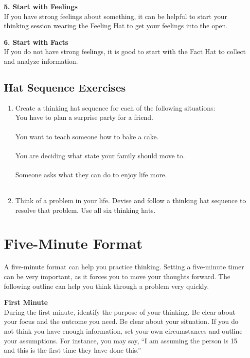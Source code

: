 \textbf{5. Start with Feelings} \\
If you have strong feelings about something, it can be helpful to start your thinking session wearing the Feeling Hat to get your feelings into the open.

\textbf{6. Start with Facts} \\
If you do not have strong feelings, it is good to start with the Fact Hat to collect and analyze information. 

\section*{Hat Sequence Exercises}

\begin{enumerate}
	\item Create a thinking hat sequence for each of the following situations: \\
	You have to plan a surprise party for a friend. \\~\\
	You want to teach someone how to bake a cake. \\~\\
	You are deciding what state your family should move to. \\~\\
	Someone asks what they can do to enjoy life more. \\~\\
	\item Think of a problem in your life. Devise and follow a thinking hat sequence to resolve that problem. Use all six thinking hats.
\end{enumerate}

\chapter{Five-Minute Format}


A five-minute format can help you practice thinking. Setting a five-minute timer can be very important, as it forces you to move your thoughts forward. The following outline can help you think through a problem very quickly.

\textbf{First Minute} \\
During the first minute, identify the purpose of your thinking. Be clear about your focus and the outcome you need. Be clear about your situation. If you do not think you have enough information, set your own circumstances and outline your assumptions. For instance, you may say, ``I am assuming the person is 15 and this is the first time they have done this.''

